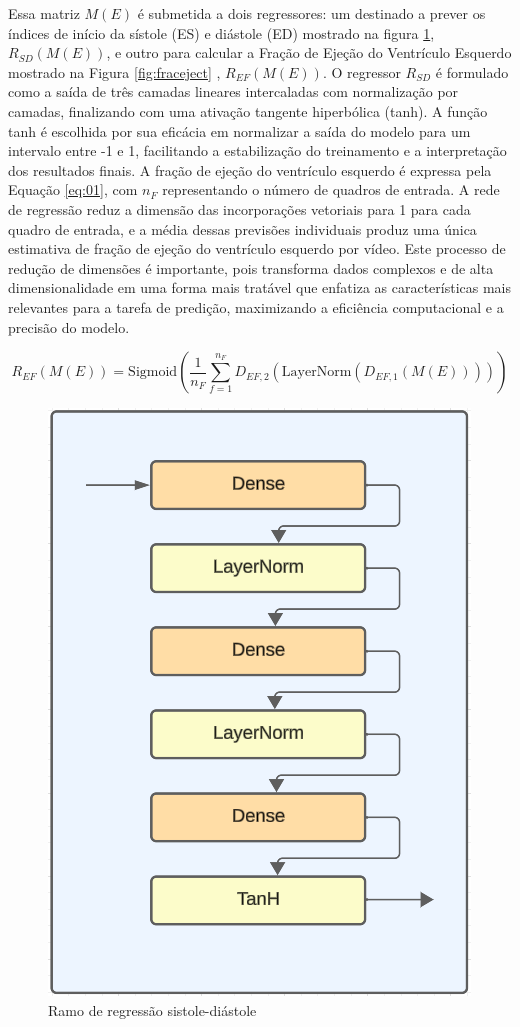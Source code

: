 Essa matriz \(M(E)\) é submetida a dois regressores: um destinado a prever os índices de início da sístole (ES) e diástole (ED) mostrado na figura \ref{fig:reg01}, \(R_{SD}(M(E))\), e outro para calcular a Fração de Ejeção do Ventrículo Esquerdo mostrado na Figura \ref{fig:fraceject} , \(R_{EF}(M(E))\). O regressor \(R_{SD}\) é formulado como a saída de três camadas lineares intercaladas com normalização por camadas, finalizando com uma ativação tangente hiperbólica (tanh). A função tanh é escolhida por sua eficácia em normalizar a saída do modelo para um intervalo entre -1 e 1, facilitando a estabilização do treinamento e a interpretação dos resultados finais. A fração de ejeção do ventrículo esquerdo é expressa pela Equação \ref{eq:01}, com \(n_F\) representando o número de quadros de entrada. A rede de regressão reduz a dimensão das incorporações vetoriais para 1 para cada quadro de entrada, e a média dessas previsões individuais produz uma única estimativa de fração de ejeção do ventrículo esquerdo por vídeo. Este processo de redução de dimensões é importante, pois transforma dados complexos e de alta dimensionalidade em uma forma mais tratável que enfatiza as características mais relevantes para a tarefa de predição, maximizando a eficiência computacional e a precisão do modelo.


\begin{equation}
R_{EF}(M(E)) = \text{Sigmoid} \left( \frac{1}{n_F} \sum_{f=1}^{n_F} D_{EF,2} \left( \text{LayerNorm} \left( D_{EF,1} (M(E)) \right) \right) \right)
\label{eq:01}
\end{equation}



\begin{figure}
    \centering
    \includegraphics[width=0.5\linewidth]{imagereg.png}
    \caption{Ramo de regressão sistole-diástole}
    \label{fig:reg01}
\end{figure}



